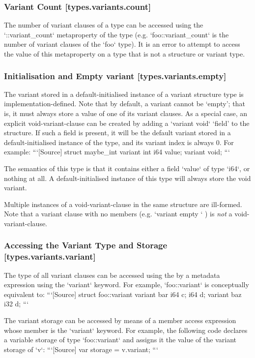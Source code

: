 \documentclass[a4paper, 12pt, oneside, final]{article}
\begin{document}
\subsubsection{Variant Count [types.variants.count]}
The number of variant clauses of a type can be accessed using the `::variant_count` metaproperty of the type
(e.g. `foo::variant_count` is the number of variant clauses of the `foo` type). It is an error
to attempt to access the value of this metaproperty on a type that is not a structure or variant type.

\subsubsection{Initialisation and Empty variant [types.variants.empty]}
The variant stored in a default-initialised instance of a variant structure type is implementation-defined. Note
that by default, a variant cannot be ‘empty’; that is, it must always store a value of one of its variant clauses.
As a special case, an explicit void-variant-clause can be created by adding a `variant void` ‘field’ to the
structure. If such a field is present, it will be the default variant stored in a default-initialised instance of
the type, and its variant index is always 0. For example:
```[Source]
struct maybe_int {
    variant int { i64 value; }
    variant void;
}
```

The semantics of this type is that it contains either a field `value` of type `i64`, or nothing at all.
A default-initialised instance of this type will always store the void variant.

Multiple instances of a void-variant-clause in the same structure are ill-formed. Note that a variant clause with no members
(e.g. `variant empty {}` ) is \textit{not} a void-variant-clause.

\subsubsection{Accessing the Variant Type and Storage [types.variants.variant]}
The type of all variant clauses can be accessed using the by a metadata expression using the `variant` keyword.
For example, `foo::variant` is conceptually equivalent to:
```[Source]
struct foo::variant {
    variant bar { i64 c; i64 d; }
    variant baz { i32 d; }
}
```

The variant storage can be accessed by means of a member access expression whose member is the `variant` keyword. For
example, the following code declares a variable storage of type `foo::variant` and assigns it the value
of the variant storage of `v`:
```[Source]
var storage = v.variant;
```
\end{document}
